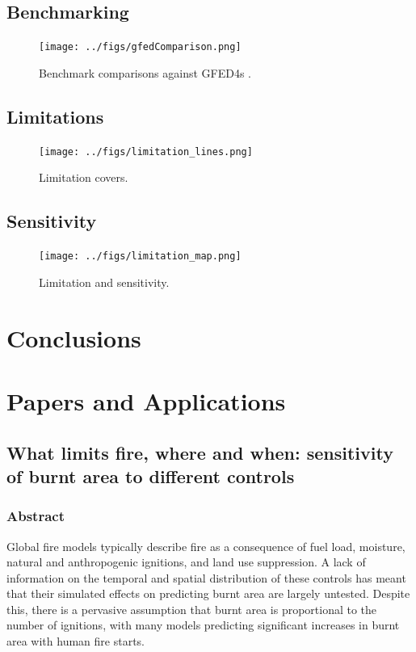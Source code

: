 \documentclass[12pt]{article}
\begin{document}
\subsection{Benchmarking}

\begin{figure}[!ht]
  \centering
    \texttt{[image: ../figs/gfedComparison.png]}
  \caption{Benchmark comparisons against GFED4s \citep{Giglio2013}.}
\end{figure}

\subsection{Limitations}

\begin{figure}[!ht]
  \centering
    \texttt{[image: ../figs/limitation\_lines.png]}

  \caption{Limitation covers.}
\end{figure}


\subsection{Sensitivity}

\begin{figure}[!ht]
  \centering
    \texttt{[image: ../figs/limitation\_map.png]}

  \caption{Limitation and sensitivity.}
\end{figure}

\section{Conclusions}\label{conclusions}

\section{Papers and Applications}

\subsection{What limits fire, where and when: sensitivity of burnt area to different controls}

\subsubsection{Abstract}
Global fire models typically describe fire as a consequence of fuel load, moisture, natural and anthropogenic
ignitions, and land use suppression. A lack of information on the temporal and spatial distribution of these
controls has meant that their simulated effects on predicting burnt area are largely untested. Despite this,
there is a pervasive assumption that burnt area is proportional to the number of ignitions, with many models
predicting significant increases in burnt area with human fire starts.
\end{document}
